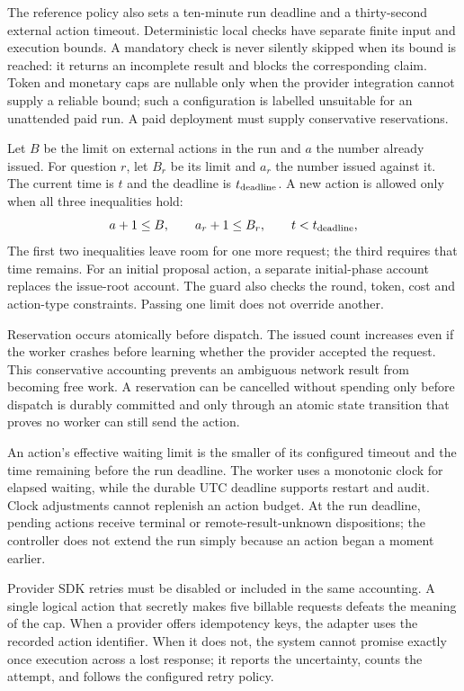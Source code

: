 The reference policy also sets a ten-minute run deadline and a thirty-second
external action timeout. Deterministic local checks have separate finite input
and execution bounds. A mandatory check is never silently skipped when its bound
is reached: it returns an incomplete result and blocks the corresponding claim.
Token and monetary caps are nullable only when the provider integration cannot
supply a reliable bound; such a configuration is labelled unsuitable for an
unattended paid run. A paid deployment must supply conservative reservations.


Let $B$ be the limit on external actions in the run and $a$ the number already
issued. For question $r$, let $B_r$ be its limit and $a_r$ the number issued
against it. The current time is $t$ and the deadline is $t_{\rm deadline}$. A
new action is allowed only when all three inequalities hold:
\begin{equation}
 a+1\leq B,\qquad a_r+1\leq B_r,\qquad t<t_{\rm deadline},
 \label{eq:budget-guard}
\end{equation}
The first two inequalities leave room for one more request; the third requires
that time remains. For an initial proposal action, a separate initial-phase account replaces the
issue-root account. The guard also checks the round, token, cost and action-type
constraints. Passing one limit does not override another.

Reservation occurs atomically before dispatch. The issued count increases even if
the worker crashes before learning whether the provider accepted the request.
This conservative accounting prevents an ambiguous network result from becoming
free work. A reservation can be cancelled without spending only before dispatch
is durably committed and only through an atomic state transition that proves no
worker can still send the action.

An action's effective waiting limit is the smaller of its configured timeout
and the time remaining before the run deadline. The worker uses a monotonic clock
for elapsed waiting, while the durable UTC deadline supports restart and audit.
Clock adjustments cannot replenish an action budget. At the run deadline, pending
actions receive terminal or remote-result-unknown dispositions; the controller
does not extend the run simply because an action began a moment earlier.

Provider SDK retries must be disabled or included in the same accounting. A
single logical action that secretly makes five billable requests defeats the
meaning of the cap. When a provider offers idempotency keys, the adapter uses the
recorded action identifier. When it does not, the system cannot promise exactly
once execution across a lost response; it reports the uncertainty, counts the
attempt, and follows the configured retry policy.

